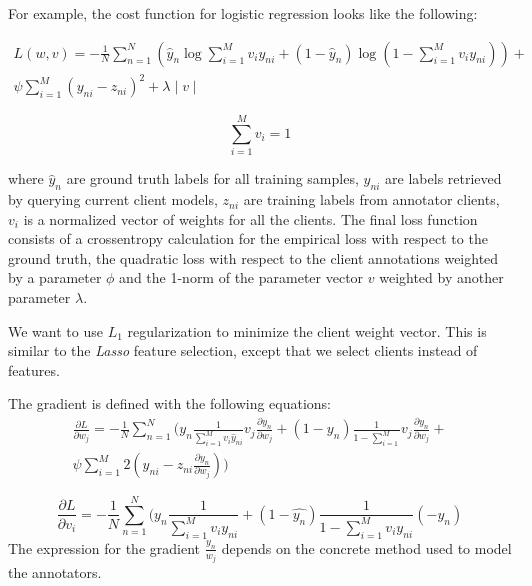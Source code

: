 \documentclass{llncs}
\begin{document}
For example, the cost function for logistic regression looks like the following:

\begin{equation}
\begin{split}
 L(w,v)= -\frac{1}{N} \sum_{n=1}^N (\hat{y}_n \log \sum_{i=1}^M v_i y_{ni} + (1-\hat{y}_n) \log(1-\sum_{i=1}^M v_i y_{ni})) + \\ \psi \sum_{i=1}^{M} (y_{ni} - z_{ni})^2+\lambda \mid v \mid
\end{split} 
\end{equation}

\begin{equation}
\sum_{i=1}^{M} v_i = 1 
\end{equation}

where $ \hat{y}_n $ are ground truth labels for all training samples, $ y_{ni} $ are labels retrieved by querying  current client models, $z_{ni}$ are training labels from annotator clients, $v_i$ is a normalized vector of weights for all the clients. The final loss function consists of a crossentropy calculation for the empirical loss with respect to the ground truth, the quadratic loss with respect to the client annotations weighted by a parameter $\phi$ and the 1-norm of the parameter vector $v$ weighted by another parameter $\lambda$.

We want to use $L_1$ regularization to minimize the client weight vector. This is similar to the \textit{Lasso} feature selection, except that we select clients instead of features. 

The gradient is defined with the following equations:
\begin{equation}
\begin{split}
 \frac{\partial L}{\partial w_j} = -\frac{1}{N} \sum_{n=1}^N (y_n \frac{1}{\sum_{i=1}^M v_i \hat{y}_{ni}} v_j \frac{\partial y_n}{\partial w_j} + (1-y_n) \frac{1}{1-\sum_{i=1}^M } v_j \frac{\partial y_n}{\partial w_j} + \\  \psi \sum_{i=1}^M 2 (y_{ni} - z_{ni} \frac{\partial y_n}{\partial w_j}  ))
\end{split}
\end{equation}

\begin{equation} \frac{\partial L}{\partial v_i} =  -\frac{1}{N} \sum_{n=1}^N (y_n \frac{1}{\sum_{i=1}^M v_i y_{ni}} + (1-\hat{y_n}) \frac{1} {1-\sum_{i=1}^M v_i y_{ni}} (-y_n) 
\end{equation}
The expression for the gradient $ \frac{y_n}{w_j}$ depends on the concrete method used to model the annotators.
\end{document}

